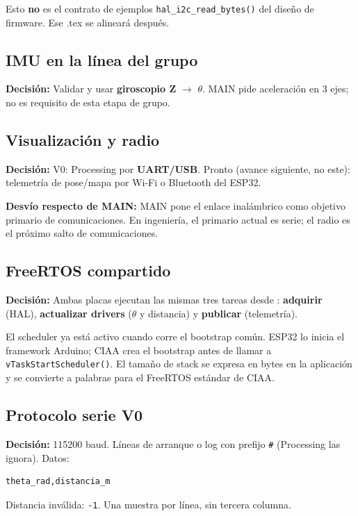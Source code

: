\documentclass[11pt,a4paper]{article}
\newcommand{\ruta}[1]{\path{#1}}
\newcommand{\decision}[1]{\textbf{Decisi\'on:} #1}
\newcommand{\desvio}[1]{\textbf{Desv\'io respecto de MAIN:} #1}
\begin{document}
Esto \textbf{no} es el contrato de ejemplos \texttt{hal\_i2c\_read\_bytes()}
del dise\~no de firmware. Ese .tex se alinear\'a despu\'es.

\subsection{IMU en la l\'inea del grupo}

\decision{Validar y usar \textbf{giroscopio Z} $\rightarrow$ $\theta$.
MAIN pide aceleraci\'on en 3 ejes; no es requisito de esta etapa de grupo.}

\subsection{Visualizaci\'on y radio}

\decision{V0: Processing por \textbf{UART/USB}. Pronto (avance siguiente,
no este): telemetr\'ia de pose/mapa por Wi-Fi o Bluetooth del ESP32.}

\desvio{MAIN pone el enlace inal\'ambrico como objetivo primario de
comunicaciones. En ingenier\'ia, el primario actual es serie; el radio es
el pr\'oximo salto de comunicaciones.}

\subsection{FreeRTOS compartido}

\decision{Ambas placas ejecutan las mismas tres tareas desde
\ruta{shared/layer3\_app}: \textbf{adquirir} (HAL),
\textbf{actualizar drivers} ($\theta$ y distancia) y
\textbf{publicar} (telemetr\'ia).}

El scheduler ya est\'a activo cuando corre el bootstrap com\'un. ESP32 lo
inicia el framework Arduino; CIAA crea el bootstrap antes de llamar a
\texttt{vTaskStartScheduler()}. El tama\~no de stack se expresa en bytes en
la aplicaci\'on y se convierte a palabras para el FreeRTOS est\'andar de CIAA.

\subsection{Protocolo serie V0}

\decision{115200 baud. L\'ineas de arranque o log con prefijo \texttt{\#}
(Processing las ignora). Datos:}
\begin{lstlisting}
theta_rad,distancia_m
\end{lstlisting}
Distancia inv\'alida: \texttt{-1}. Una muestra por l\'inea, sin tercera columna.
\end{document}
